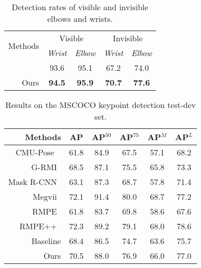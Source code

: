 \documentclass[10pt,journal,compsoc]{IEEEtran}
\begin{document}
\begin{table}[t!]
 \caption{Detection rates of visible and invisible elbows and wrists.} \label{tab:Detection-rates-of}
%
 \small
 \centering
 \renewcommand\arraystretch{1}
 \begin{tabular}{ r ||cc|cc }
  \hline
  \multirow{2}{*}{Methods} & \multicolumn{2}{c}{Visible} & \multicolumn{2}{c}{Invisible}\\
\cline{2-5} & \emph{Wrist} & \emph{Elbow} & \emph{Wrist} & \emph{Elbow} \\
  \hline
  \hline
 ~\cite{conf/eccv/NewellYD16} & 93.6  &  95.1  &  67.2  &  74.0 \\
  \hline
  Ours &  \textbf{94.5}  &  \textbf{95.9}   & \textbf{70.7}  &  \textbf{77.6}  \\
  \hline
 \end{tabular}
\end{table}

\begin{table}[t]
 \caption{Results on the MSCOCO keypoint detection test-dev set.} \label{tab:MSCOCO2}
%
 \small
 \centering
 \renewcommand\arraystretch{1}
 \begin{tabular}{ r  |c|c|c|c|c }
  \hline
  \multirow{1}{*}{Methods} & {\textbf{AP}} & \multicolumn{1}{c}{AP$^{50}$}  & \multicolumn{1}{c}{AP$^{75}$} & \multicolumn{1}{c}{AP$^{M}$}  & \multicolumn{1}{c}{AP$^{L}$}\\
  \hline
CMU-Pose ~\cite{cao2017realtime} & 61.8 &  \multicolumn{1}{c}{84.9}  &  \multicolumn{1}{c}{67.5}  &  \multicolumn{1}{c}{57.1} &  \multicolumn{1}{c}{68.2}\\
G-RMI~\cite{papandreou2017towards} &  68.5  &  \multicolumn{1}{c}{87.1}  &  \multicolumn{1}{c}{75.5}  &  \multicolumn{1}{c}{65.8}  &  \multicolumn{1}{c}{73.3}\\
Mask R-CNN~\cite{he2017mask} &  63.1  &  \multicolumn{1}{c}{87.3}  &  \multicolumn{1}{c}{68.7}  &  \multicolumn{1}{c}{57.8}  &  \multicolumn{1}{c}{71.4}\\
Megvii~\cite{chen2017cascaded} &  72.1 &  \multicolumn{1}{c}{91.4}  &  \multicolumn{1}{c}{80.0}  &  \multicolumn{1}{c}{68.7}  &  \multicolumn{1}{c}{77.2}\\
RMPE~\cite{fang2017rmpe} &  61.8  &  \multicolumn{1}{c}{83.7}  &  \multicolumn{1}{c}{69.8}  &  \multicolumn{1}{c}{58.6}  &  \multicolumn{1}{c}{67.6}\\
RMPE++~\cite{fang2017rmpe} &  72.3  &  \multicolumn{1}{c}{89.2}  &  \multicolumn{1}{c}{79.1}  &  \multicolumn{1}{c}{68.0}  &  \multicolumn{1}{c}{78.6}\\
      \hline
Baseline &  68.4  &  \multicolumn{1}{c}{86.5}  &  \multicolumn{1}{c}{74.7}  &  \multicolumn{1}{c}{63.6}  &  \multicolumn{1}{c}{75.7}\\
Ours &  70.5  &  \multicolumn{1}{c}{88.0}  &  \multicolumn{1}{c}{76.9}  &  \multicolumn{1}{c}{66.0}  &  \multicolumn{1}{c}{77.0}\\

  \hline
 \end{tabular}
\end{table}
\end{document}
